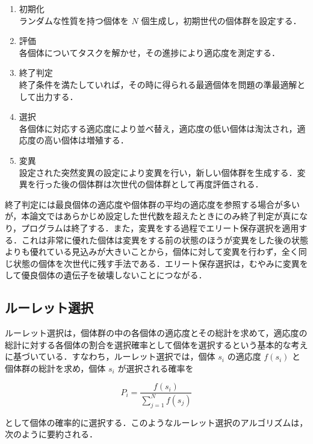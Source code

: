 \begin{enumerate}
    \item 初期化 \\
    ランダムな性質を持つ個体を $ N $ 個生成し，初期世代の個体群を設定する．

    \item 評価 \\
    各個体についてタスクを解かせ，その進捗により適応度を測定する．

    \item 終了判定 \\
    終了条件を満たしていれば，その時に得られる最適個体を問題の準最適解として出力する．

    \item 選択 \\
    各個体に対応する適応度により並べ替え，適応度の低い個体は淘汰され，適応度の高い個体は増殖する．

    \item 変異 \\
    設定された突然変異の設定により変異を行い，新しい個体群を生成する．変異を行った後の個体群は次世代の個体群として再度評価される．
\end{enumerate}

終了判定には最良個体の適応度や個体群の平均の適応度を参照する場合が多いが，本論文ではあらかじめ設定した世代数を超えたときにのみ終了判定が真になり，プログラムは終了する．また，変異をする過程でエリート保存選択を適用する．これは非常に優れた個体は変異をする前の状態のほうが変異をした後の状態よりも優れている見込みが大きいことから，個体に対して変異を行わず，全く同じ状態の個体を次世代に残す手法である．エリート保存選択は，むやみに変異をして優良個体の遺伝子を破壊しないことにつながる．

\subsection{ルーレット選択}
ルーレット選択は，個体群の中の各個体の適応度とその総計を求めて，適応度の総計に対する各個体の割合を選択確率として個体を選択するという基本的な考えに基づいている\cite{遺伝的アルゴリズム}．すなわち，ルーレット選択では，個体 $ s_i $ の適応度 $ f(s_i) $ と個体群の総計を求め，個体 $ s_i $ が選択される確率を

\begin{equation}
    P_i = \frac{f(s_i)}{\sum^N_{j=1} f(s_j)}
\end{equation}

として個体の確率的に選択する．このようなルーレット選択のアルゴリズムは，次のように要約される．


